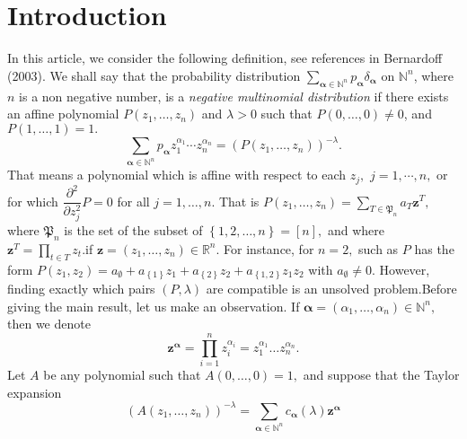 \documentclass[a4paper,oneside,notitlepage]{article}%
\begin{document}
\section{Introduction}

In this article, we consider the following definition, see references in
Bernardoff (2003). We shall say that the probability distribution
$\sum\limits_{\mathbf{\boldsymbol{\alpha}}\in\mathbb{N}^{n}}%
p_{\mathbf{\boldsymbol{\alpha}}}\delta_{\mathbf{\boldsymbol{\alpha}}}$ on
$\mathbb{N}^{n}$, where $n$ is a non negative number, is a \textit{negative
multinomial distribution} if there exists an affine polynomial $P\left(
z_{1},\ldots,z_{n}\right)  $ and $\lambda>0$ such that $P\left(
0,\ldots,0\right)  \neq0$, and $P\left(  1,\ldots,1\right)  =1.$%
\begin{equation}
\sum\limits_{\boldsymbol{\alpha}\in\mathbb{N}^{n}}p_{\boldsymbol{\alpha}}%
z_{1}^{\alpha_{1}}\cdots z_{n}^{\alpha_{n}}=\left(  P\left(  z_{1}%
,\ldots,z_{n}\right)  \right)  ^{-\lambda}. \label{zalpha}%
\end{equation}
That means a polynomial which is affine with respect to each $z_{j},$
$j=1,\cdots,n,$ or for which $\dfrac{\partial^{2}}{\partial z_{j}^{2}}P=0$ for
all $j=1,\ldots,n.$ That is $P\left(  z_{1},\ldots,z_{n}\right)
=\sum\limits_{T\in\mathfrak{P}_{n}}a_{T}\mathbf{z}^{T},$ where $\mathfrak{P}%
_{n}$ is the set of the subset of $\left\{  1,2,\ldots,n\right\}  =\left[
n\right]  ,$ and where $\mathbf{z}^{T}=\prod_{t\in T}z_{t}.$if $\mathbf{z}%
=\left(  z_{1},\ldots,z_{n}\right)  \in\mathbb{R}^{n}.$ For instance, for
$n=2,$ such as $P$ has the form $P\left(  z_{1},z_{2}\right)  =a_{\emptyset
}+a_{\left\{  1\right\}  }z_{1}+a_{\left\{  2\right\}  }z_{2}+a_{\left\{
1,2\right\}  }z_{1}z_{2}$ with $a_{\emptyset}\neq0.$ However, finding exactly
which pairs $\left(  P,\lambda\right)  $ are compatible is an unsolved
problem.\newline Before giving the main result, let us make an observation. If
\textbf{$\boldsymbol{\alpha}$}$=\left(  \alpha_{1},\ldots,\alpha_{n}\right)
\in\mathbb{N}^{n},$ then we denote%
\begin{equation}
\mathbf{z}^{\mathbf{\boldsymbol{\alpha}}}=\prod_{i=1}^{n}z_{i}^{\alpha_{i}%
}=z_{1}^{\alpha_{1}}\ldots z_{n}^{\alpha_{n}}. \label{zalpha2}%
\end{equation}
Let $A$ be any polynomial such that $A\left(  0,\ldots,0\right)  =1,$ and
suppose that the Taylor expansion%
\[
\left(  A\left(  z_{1},\ldots,z_{n}\right)  \right)  ^{-\lambda}%
=\sum_{\mathbf{\boldsymbol{\alpha}}\in\mathbb{N}^{n}}%
c_{\mathbf{\boldsymbol{\alpha}}}\left(  \lambda\right)  \mathbf{z}%
^{\mathbf{\boldsymbol{\alpha}}}%
\]
\end{document}
